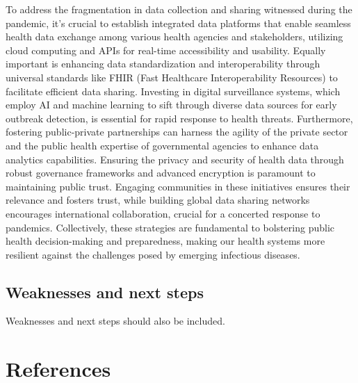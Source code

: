 \documentclass[
  letterpaper,
  DIV=11,
  numbers=noendperiod]{scrartcl}
\begin{document}
To address the fragmentation in data collection and sharing witnessed
during the pandemic, it's crucial to establish integrated data platforms
that enable seamless health data exchange among various health agencies
and stakeholders, utilizing cloud computing and APIs for real-time
accessibility and usability. Equally important is enhancing data
standardization and interoperability through universal standards like
FHIR (Fast Healthcare Interoperability Resources) to facilitate
efficient data sharing. Investing in digital surveillance systems, which
employ AI and machine learning to sift through diverse data sources for
early outbreak detection, is essential for rapid response to health
threats. Furthermore, fostering public-private partnerships can harness
the agility of the private sector and the public health expertise of
governmental agencies to enhance data analytics capabilities. Ensuring
the privacy and security of health data through robust governance
frameworks and advanced encryption is paramount to maintaining public
trust. Engaging communities in these initiatives ensures their relevance
and fosters trust, while building global data sharing networks
encourages international collaboration, crucial for a concerted response
to pandemics. Collectively, these strategies are fundamental to
bolstering public health decision-making and preparedness, making our
health systems more resilient against the challenges posed by emerging
infectious diseases.

\subsection{Weaknesses and next steps}\label{weaknesses-and-next-steps}

Weaknesses and next steps should also be included.

\newpage

\section*{References}\label{references}
\end{document}
